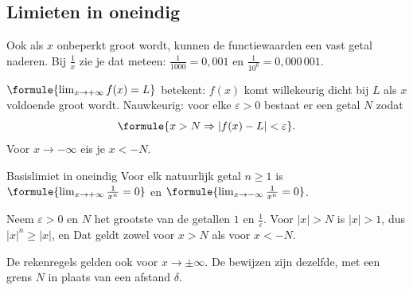 \begin{oefeningen}
\end{oefeningen}

\subsection{Limieten in oneindig}

Ook als $x$ onbeperkt groot wordt, kunnen de functiewaarden een vast getal naderen. Bij $\frac1x$ zie je dat meteen: $\frac{1}{1000} = 0{,}001$ en $\frac{1}{10^6} = 0{,}000\,001$.

\begin{theorie}
$\formule{\lim_{x \to +\infty} f(x) = L}$ betekent: $f(x)$ komt willekeurig dicht bij $L$ als $x$ voldoende groot wordt. Nauwkeurig: voor elke $\varepsilon > 0$ bestaat er een getal $N$ zodat
\[\formule{x > N \Rightarrow |f(x) - L| < \varepsilon}.\]
Voor $x \to -\infty$ eis je $x < -N$.

\begin{stelling}{Basislimiet in oneindig}
Voor elk natuurlijk getal $n \geqslant 1$ is \quad $\formule{\lim_{x \to +\infty} \frac{1}{x^n} = 0}$ \quad en \quad $\formule{\lim_{x \to -\infty} \frac{1}{x^n} = 0}$.
\end{stelling}
\begin{bewijs}
Neem $\varepsilon > 0$ en $N$ het grootste van de getallen $1$ en $\frac{1}{\varepsilon}$. Voor $|x| > N$ is $|x| > 1$, dus $|x|^n \geqslant |x|$, en
Dat geldt zowel voor $x > N$ als voor $x < -N$.
\end{bewijs}
\end{theorie}

De rekenregels gelden ook voor $x \to \pm\infty$. De bewijzen zijn dezelfde, met een grens $N$ in plaats van een afstand $\delta$.


